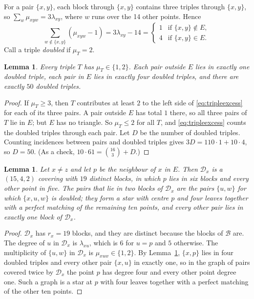 \documentclass[11pt]{amsart}
\newtheorem{lemma}[theorem]{Lemma}
\theoremstyle{definition}
\theoremstyle{remark}
\newcommand{\cB}{\mathcal{B}}
\newcommand{\cD}{\mathcal{D}}
\begin{document}
For a pair $\{x,y\}$, each block through $\{x,y\}$ contains three triples
through $\{x,y\}$, so $\sum_{w}\mu_{xyw}=3\lambda_{xy}$, where $w$ runs over
the 14 other points. Hence
\begin{equation}\label{eq:tripleexcess}
\sum_{w\notin\{x,y\}}(\mu_{xyw}-1)=3\lambda_{xy}-14=
\begin{cases} 1 & \text{if } \{x,y\}\notin E,\\ 4 & \text{if }
\{x,y\}\in E.\end{cases}
\end{equation}
Call a triple \emph{doubled} if $\mu_T=2$.

\begin{lemma}\label{lem:triples}
Every triple $T$ has $\mu_T\in\{1,2\}$. Each pair outside $E$ lies in exactly
one doubled triple, each pair in $E$ lies in exactly four doubled triples, and
there are exactly $50$ doubled triples.
\end{lemma}

\begin{proof}
If $\mu_T\ge 3$, then $T$ contributes at least $2$ to the left side of
\eqref{eq:tripleexcess} for each of its three pairs. A pair outside $E$ has
total $1$ there, so all three pairs of $T$ lie in $E$; but $E$ has no
triangle. So $\mu_T\le 2$ for all $T$, and \eqref{eq:tripleexcess} counts the
doubled triples through each pair. Let $D$ be the number of doubled
triples. Counting incidences between pairs and doubled triples gives
$3D=110\cdot 1+10\cdot 4$, so $D=50$. (As a check,
$10\cdot 61=\binom{16}{3}+D$.)
\end{proof}

\begin{lemma}\label{lem:derived}
Let $x\ne z$ and let $p$ be the neighbour of $x$ in $E$. Then $\cD_x$ is a
$(15,4,2)$ covering with $19$ distinct blocks, in which $p$ lies in six blocks
and every other point in five. The pairs that lie in two blocks of $\cD_x$ are
the pairs $\{u,w\}$ for which $\{x,u,w\}$ is doubled; they form a star with
centre $p$ and four leaves together with a perfect matching of the remaining
ten points, and every other pair lies in exactly one block of $\cD_x$.
\end{lemma}

\begin{proof}
$\cD_x$ has $r_x=19$ blocks, and they are distinct because the blocks of $\cB$
are. The degree of $u$ in $\cD_x$ is $\lambda_{xu}$, which is $6$ for $u=p$
and $5$ otherwise. The multiplicity of $\{u,w\}$ in $\cD_x$ is $\mu_{xuw}\in
\{1,2\}$. By Lemma~\ref{lem:triples}, $\{x,p\}$ lies in four doubled triples
and every other pair $\{x,u\}$ in exactly one, so in the graph of pairs
covered twice by $\cD_x$ the point $p$ has degree four and every other point
degree one. Such a graph is a star at $p$ with four leaves together with a
perfect matching of the other ten points.
\end{proof}
\end{document}
